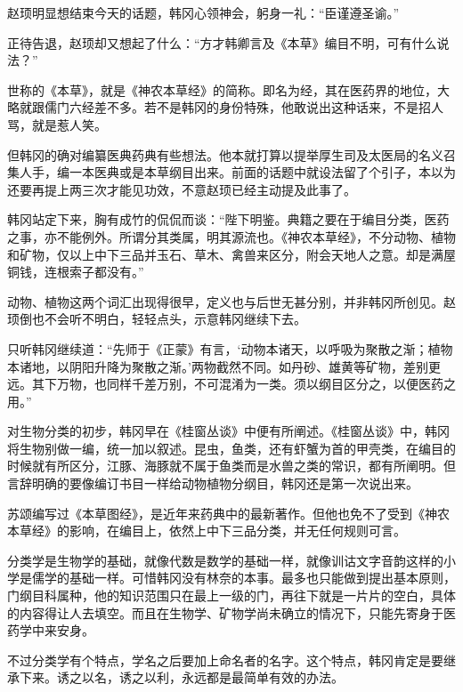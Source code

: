 赵顼明显想结束今天的话题，韩冈心领神会，躬身一礼：“臣谨遵圣谕。”

正待告退，赵顼却又想起了什么：“方才韩卿言及《本草》编目不明，可有什么说法？”

世称的《本草》，就是《神农本草经》的简称。即名为经，其在医药界的地位，大略就跟儒门六经差不多。若不是韩冈的身份特殊，他敢说出这种话来，不是招人骂，就是惹人笑。

但韩冈的确对编纂医典药典有些想法。他本就打算以提举厚生司及太医局的名义召集人手，编一本医典或是本草纲目出来。前面的话题中就设法留了个引子，本以为还要再提上两三次才能见功效，不意赵顼已经主动提及此事了。

韩冈站定下来，胸有成竹的侃侃而谈：“陛下明鉴。典籍之要在于编目分类，医药之事，亦不能例外。所谓分其类属，明其源流也。《神农本草经》，不分动物、植物和矿物，仅以上中下三品并玉石、草木、禽兽来区分，附会天地人之意。却是满屋铜钱，连根索子都没有。”

动物、植物这两个词汇出现得很早，定义也与后世无甚分别，并非韩冈所创见。赵顼倒也不会听不明白，轻轻点头，示意韩冈继续下去。

只听韩冈继续道：“先师于《正蒙》有言，‘动物本诸天，以呼吸为聚散之渐；植物本诸地，以阴阳升降为聚散之渐。’两物截然不同。如丹砂、雄黄等矿物，差别更远。其下万物，也同样千差万别，不可混淆为一类。须以纲目区分之，以便医药之用。”

对生物分类的初步，韩冈早在《桂窗丛谈》中便有所阐述。《桂窗丛谈》中，韩冈将生物别做一编，统一加以叙述。昆虫，鱼类，还有虾蟹为首的甲壳类，在编目的时候就有所区分，江豚、海豚就不属于鱼类而是水兽之类的常识，都有所阐明。但言辞明确的要像编订书目一样给动物植物分纲目，韩冈还是第一次说出来。

苏颂编写过《本草图经》，是近年来药典中的最新著作。但他也免不了受到《神农本草经》的影响，在编目上，依然上中下三品分类，并无任何规则可言。

分类学是生物学的基础，就像代数是数学的基础一样，就像训诂文字音韵这样的小学是儒学的基础一样。可惜韩冈没有林奈的本事。最多也只能做到提出基本原则，门纲目科属种，他的知识范围只在最上一级的门，再往下就是一片片的空白，具体的内容得让人去填空。而且在生物学、矿物学尚未确立的情况下，只能先寄身于医药学中来安身。

不过分类学有个特点，学名之后要加上命名者的名字。这个特点，韩冈肯定是要继承下来。诱之以名，诱之以利，永远都是最简单有效的办法。

